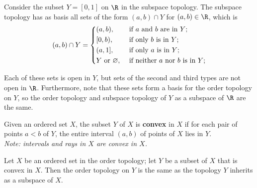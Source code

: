 \begin{eg}
Consider the subset $Y = [0, 1]$ on $\R$ in the subspace topology. The subspace topology has as basis all sets of the form $(a, b) \cap Y$
for $(a, b) \in \R$, which is
\[
    (a, b) \cap Y = \begin{dcases}
        (a, b), &\text{ if $a$ and $b$ are in $Y$}  ;\\
        [0, b), &\text{ if only $b$ is in $Y$}  ;\\
        (a, 1], &\text{ if only $a$ is in $Y$} ;\\
        Y \text{ or } \varnothing, &\text{ if neither $a$ nor $b$ is in $Y$};
    \end{dcases}
\]

Each of these sets is open in $Y$, but sets of the second and third types are not open in $\R$. 
Furthermore, note that these sets form a basis for the order topology on $Y$, so
the order topology and subspace topology of $Y$ as a subspace of $\R$ are the same.
\end{eg}

\begin{definition}
Given an ordered set $X$, the subset $Y$ of $X$ is \textbf{convex} in $X$ if for each pair of points $a < b$ of $Y$, the entire
interval $(a, b)$ of points of $X$ lies in $Y$.\\

\textit{Note: intervals and rays in $X$ are convex in $X$.}
\end{definition}

\begin{theorem}
Let $X$ be an ordered set in the order topology; let $Y$ be a subset of $X$ that is convex in $X$. Then the order topology on $Y$ is the
same as the topology $Y$ inherits as a subspace of $X$.
\end{theorem}
